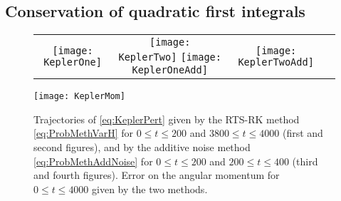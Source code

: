 \documentclass[final,onefignum,onetabnum]{siamonline171218}
\begin{document}
\subsection{Conservation of quadratic first integrals} 

\begin{figure}[t]
	\begin{center}
		\begin{tabular}{cccc}
			\texttt{[image: KeplerOne]} & \texttt{[image: KeplerTwo]} \texttt{[image: KeplerOneAdd]} & \texttt{[image: KeplerTwoAdd]} \\
		\end{tabular}
	\texttt{[image: KeplerMom]}
	\end{center}
	\caption{Trajectories of \eqref{eq:KeplerPert} given by the RTS-RK method \eqref{eq:ProbMethVarH} for $0 \leq t \leq 200$ and $3800 \leq t \leq 4000$ (first and second figures), and by the additive noise method \eqref{eq:ProbMethAddNoise} for $0 \leq t \leq 200$ and $200 \leq t \leq 400$ (third and fourth figures). Error on the angular momentum for $0 \leq t \leq 4000$ given by the two methods.}
	\label{fig:Kepler}
\end{figure}
\end{document}
